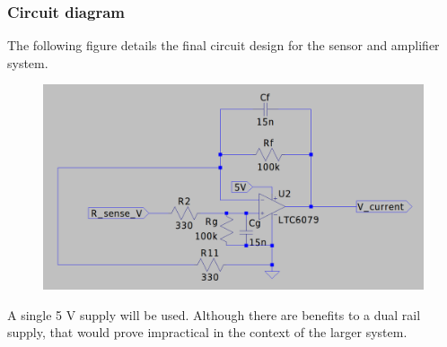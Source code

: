 \subsubsection{Circuit diagram}\label{sec:current_sensor_circuit}
The following figure details the final circuit design for the sensor and amplifier system.

\begin{figure}[h!]
  \centering
  \includegraphics[width=.8\linewidth]{Figures/Circuit}
  \label{fig:circuit-diagram}
\end{figure}

A single 5 V supply will be used. Although there are benefits to a dual rail supply, that would prove impractical in the context of the larger system.

\pagebreak
